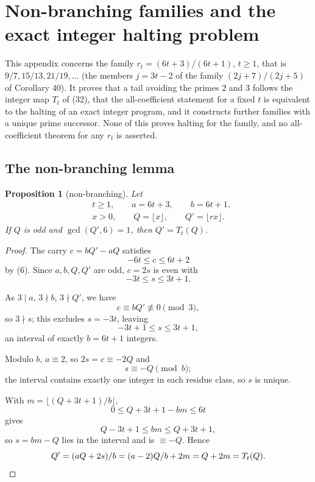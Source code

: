 \documentclass[11pt,reqno]{amsart}
\newtheorem{proposition}[theorem]{Proposition}
\theoremstyle{definition}
\theoremstyle{remark}
\begin{document}
\section{Non-branching families and the exact integer halting problem}\label{app:C}

This appendix concerns the family \(r_t=(6t+3)/(6t+1)\), \(t\ge1\),
that is \(9/7,15/13,21/19,\ldots\) (the members \(j=3t-2\) of the family
\((2j+7)/(2j+5)\) of Corollary 40). It proves that a tail avoiding the
primes \(2\) and \(3\) follows the integer map \(T_t\) of (32), that the
all-coefficient statement for a fixed \(t\) is equivalent to the halting
of an exact integer program, and it constructs further families with a
unique prime successor. None of this proves halting for the family, and
no all-coefficient theorem for any \(r_t\) is asserted.

\subsection{The non-branching lemma}\label{sec:C.1}

\begin{samepage}
\begin{proposition}[non-branching]\leavevmode\label{thm:55}
Let
\[
\begin{aligned}
&t\ge1,\qquad a=6t+3,\qquad b=6t+1,\\
&x>0,\qquad Q=\lfloor x\rfloor,\qquad Q'=\lfloor rx\rfloor.
\end{aligned}
\]
If \(Q\) is odd and \(\gcd(Q',6)=1\), then \(Q'=T_t(Q)\).
\label{thm-end:55}
\end{proposition}
\end{samepage}

\begin{proof}\leavevmode\label{proof:55}
The carry \(c=bQ'-aQ\) satisfies
\[
-6t\le c\le6t+2
\]
by (6).
Since \(a,b,Q,Q'\) are odd, \(c=2s\) is even with
\[
-3t\le s\le3t+1.
\]

As \(3\mid a\), \(3\nmid b\), \(3\nmid Q'\), we have
\[
c\equiv bQ'\not\equiv0\pmod3,
\]
so \(3\nmid s\); this excludes
\(s=-3t\), leaving
\[
-3t+1\le s\le3t+1,
\]
an interval of exactly
\(b=6t+1\) integers.

Modulo \(b\), \(a\equiv2\), so
\(2s=c\equiv-2Q\) and
\[
s\equiv-Q\pmod b;
\]
the interval contains
exactly one integer in each residue class, so \(s\) is unique.

With
\(m=\lfloor(Q+3t+1)/b\rfloor\),
\[
0\le Q+3t+1-bm\le6t
\]
gives
\[
Q-3t+1\le bm\le Q+3t+1,
\]
so \(s=bm-Q\) lies in the interval and is
\(\equiv-Q\). Hence
\[
Q'=(aQ+2s)/b=(a-2)Q/b+2m=Q+2m=T_t(Q).\qedhere
\]
\end{proof}
\end{document}
